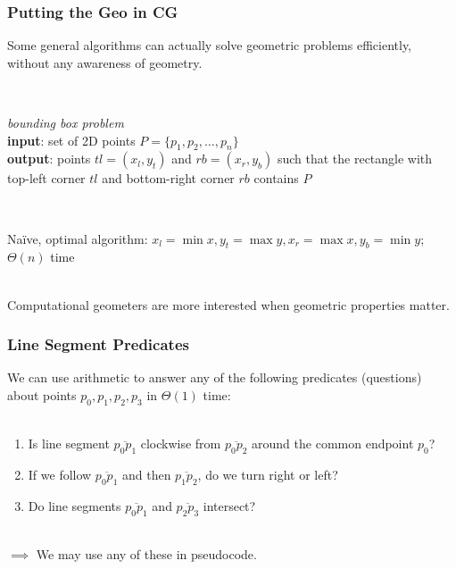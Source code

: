 \documentclass{beamer}
\newcommand{\stanza}{ \\~\ }
\begin{document}
\begin{frame} \frametitle{Putting the Geo in CG}
Some general algorithms can actually solve geometric problems efficiently, without
any awareness of geometry. \stanza

\begin{columns}
  \begin{column}{0.7 \textwidth}
  \emph{bounding box problem} \\
  \textbf{input}: set of 2D points $P=\{p_1, p_2, \ldots, p_n\}$ \\
  \textbf{output}: points $tl=(x_l, y_t)$ and $rb=(x_r, y_b)$ such that the rectangle
  with top-left corner $tl$ and bottom-right corner $rb$ contains $P$ \stanza
  \end{column}
  \begin{column}{0.3 \textwidth}
    \begin{center}
    \end{center}
  \end{column}
\end{columns}

Na\"{i}ve, optimal algorithm:
$x_l = \min x, y_t = \max y, x_r = \max x, y_b = \min y$;
$\Theta(n)$ time \stanza

Computational geometers are more interested when geometric properties matter.
\end{frame}

\begin{frame} \frametitle{Line Segment Predicates}
We can use arithmetic to answer any of the following predicates (questions)
about points $p_0, p_1, p_2, p_3$ in $\Theta(1)$ time: \stanza
\begin{enumerate}
  \item Is line segment $\overline{p_0 p_1}$ clockwise from $\overline{p_0 p_2}$
    around the common endpoint $p_0$?
  \item If we follow $\overline{p_0 p_1}$ and then $\overline{p_1 p_2}$, do we
    turn right or left?
  \item Do line segments $\overline{p_0 p_1}$ and $\overline{p_2 p_3}$
    intersect? \stanza
\end{enumerate}

$\implies$ We may use any of these in pseudocode.
\end{frame}
\end{document}
